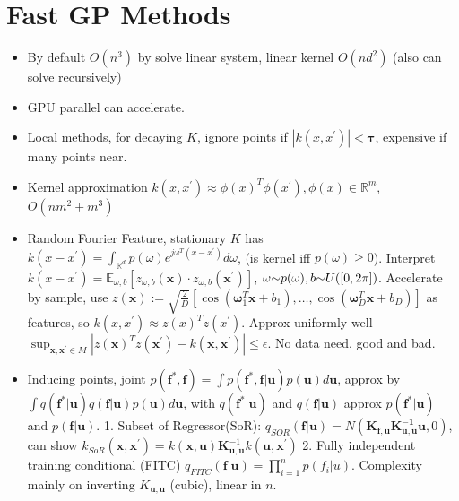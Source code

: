 \section{Fast GP Methods}
\begin{itemize}[itemsep=0pt,topsep=0pt, leftmargin=2pt, itemindent=5pt, labelwidth=5pt]
\item By default $O(n^3)$ by solve linear system, linear kernel $O(nd^2)$ (also can solve recursively)
\item GPU parallel can accelerate.
\item Local methods, for decaying $K$, ignore points if $|k(x, x^{\prime})| < \mathbf{\tau}$, expensive if many points near.
\item Kernel approximation $k(x, x^{\prime}) \approx \phi(x)^T \phi(x^{\prime}), \phi(x) \in \mathbb{R}^m$, $O(n m^2+m^3)$
\item Random Fourier Feature, stationary $K$ has $k(x-x^{\prime})=\int_{\mathbb{R}^d} p(\omega) e^{j \omega^T(x-x^{\prime})} d \omega$, (is kernel iff $p(\omega) \geq 0$). Interpret $k(x-x^{\prime})=\mathbb{E}_{\omega, b}[z_{\omega, b}(\boldsymbol{x}) \cdot z_{\omega, b}(\boldsymbol{x}^{\prime})]$, $\omega {\small \sim} p(\omega),b {\small \sim} U([0,2 \pi])$. Accelerate by sample, use $z(\boldsymbol{x}):=\sqrt{\frac{2}{D}}[\cos (\boldsymbol{\omega}_1^T \boldsymbol{x}+b_1), \ldots, \cos (\boldsymbol{\omega}_D^T \boldsymbol{x}+b_D)]$ as features, so $k(x, x^{\prime}) \approx z(x)^T z(x^{\prime})$. Approx uniformly well $\sup _{\boldsymbol{x}, \boldsymbol{x}^{\prime} \in M}|z(\boldsymbol{x})^T z(\boldsymbol{x}^{\prime})-k(\boldsymbol{x}, \boldsymbol{x}^{\prime})| \leq \epsilon$. No data need, good and bad.
\item Inducing points, joint $p(\mathbf{f}^*, \mathbf{f})=\int p(\mathbf{f}^*, \mathbf{f} | \mathbf{u}) p(\mathbf{u}) d \mathbf{u}$, 
approx by $\int q(\mathbf{f}^* | \mathbf{u}) q(\mathbf{f} | \mathbf{u}) p(\mathbf{u}) d \mathbf{u}$, 
with $q(\mathbf{f}^* | \mathbf{u})$ and $q(\mathbf{f} | \mathbf{u})$ approx $p(\mathbf{f}^* | \mathbf{u})$ and $p(\mathbf{f} | \mathbf{u})$. 
1. Subset of Regressor(SoR): $q_{S O R}(\boldsymbol{f} | \boldsymbol{u})=N(\boldsymbol{K}_{\boldsymbol{f}, \boldsymbol{u}} \boldsymbol{K}_{\boldsymbol{u}, \boldsymbol{u}}^{\boldsymbol{- 1}} \boldsymbol{u}, 0)$, can show $k_{S o R}(\mathbf{x}, \mathbf{x}^{\prime})=k(\mathbf{x}, \mathbf{u}) \mathbf{K}_{\mathbf{u}, \mathbf{u}}^{-1} k(\mathbf{u}, \mathbf{x}^{\prime})$
2. Fully independent training conditional (FITC) $q_{F I T C}(\boldsymbol{f} | \boldsymbol{u})=\prod_{i=1}^n p(f_i | u)$.
Complexity mainly on inverting $K_{\boldsymbol{u}, \boldsymbol{u}}$ (cubic), linear in $n$.
\end{itemize}
